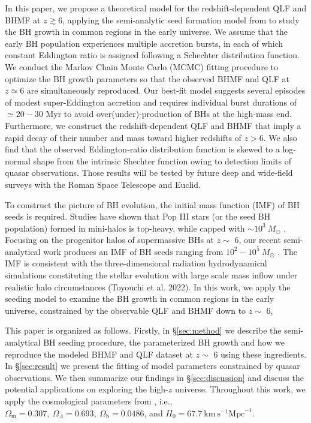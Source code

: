 \documentclass[twocolumn, twocolappendix]{aastex63}
\newcommand{\Msun}{M_\odot}
\begin{document}
\begin{CJK*}{UTF8}{gbsn}
In this paper, we propose a theoretical model for the redshift-dependent QLF and BHMF at $z\gtrsim 6$,
applying the semi-analytic seed formation model from \cite{2021ApJ...917...60L} to study the BH growth in common regions in the early universe.
We assume that the early BH population experiences multiple accretion bursts, in each of which constant Eddington ratio is assigned 
following a Schechter distribution function. 
We conduct the Markov Chain Monte Carlo (MCMC) fitting procedure to optimize the BH growth parameters 
so that the observed BHMF and QLF at $z\simeq 6$ are simultaneously reproduced. 
Our best-fit model suggests several episodes of modest super-Eddington accretion and requires
individual burst durations of $\simeq 20-30$ Myr to avoid over(under)-production of BHs at the high-mass end.
Furthermore, we construct the redshift-dependent QLF and BHMF that imply a rapid decay of 
their number and mass toward higher redshifts of $z>6$.
We also find that the observed Eddington-ratio distribution function is skewed to a log-normal shape from the intrinsic Shechter function
owing to detection limits of quasar observations.
Those results will be tested by future deep and wide-field surveys with the Roman Space Telescope and Euclid.



To construct the picture of BH evolution, the initial mass function (IMF) of BH seeds is required.
Studies have shown that Pop III stars (or the seed BH population) formed in mini-halos is top-heavy, while capped with $\sim 10^3~\Msun$ 
\citep{2014ApJ...781...60H,2015MNRAS.448..568H}.
Focusing on the progenitor halos of supermassive BHs at $z\sim$ 6, 
our recent semi-analytical work produces an IMF of BH seeds ranging from $10^2-10^5~\Msun$ \citep{2021ApJ...917...60L}. 
The IMF is consistent with the three-dimensional radiation hydrodynamical simulations 
constituting the stellar evolution with large scale mass inflow under realistic halo circumstances (Toyouchi et al. 2022).
In this work, we apply the seeding model to examine the BH growth in common regions in the early universe, 
constrained by the observable QLF and BHMF down to $z\sim$ 6, 
\fi




This paper is organized as follows. Firstly, in \S \ref{sec:method} we describe the semi-analytical BH seeding procedure, 
the parameterized BH growth and how we reproduce the modeled BHMF and QLF dataset at $z\sim$ 6 using these ingredients. 
In \S \ref{sec:result} we present the fitting of model parameters constrained by quasar observations. 
We then summarize our findings in \S \ref{sec:discussion} and discuss the potential applications on exploring the high-$z$ universe.
Throughout this work, we apply the cosmological parameters from \cite{2016A&A...594A..13P},
i.e., $\Omega_{\mathrm{m}}=0.307,~\Omega_{\Lambda}=0.693,~
\Omega_{\mathrm{b}}=0.0486$, and $H_0=67.7 \mathrm{~km} \mathrm{~s}^{-1} \mathrm{Mpc}^{-1}$.





\end{CJK*}
\end{document}
